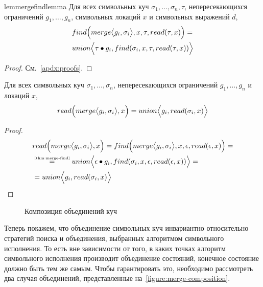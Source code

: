%
\begin{restatable}{lem}{mergefindlemma}\label{thm:merge-find}
Для всех символьных куч $\sigma_1,\ldots,\sigma_n, \tau$, непересекающихся ограничений $g_1,\ldots,g_n$, символьных локаций $x$ и символьных выражений $d$,
\begin{align*}
&find\Big(merge\big\langle g_i, \sigma_i\big\rangle,x,\tau,read(\tau,x)\Big)=\\
&union\Big\langle\tau\bullet g_i, find(\sigma_i,x,\tau,read(\tau,x))\Big\rangle
\end{align*}
\end{restatable}
\begin{proof}См.~\autoref{apdx:proofs}.
\end{proof}
%
\begin{thm}\label{thm:merge-read}
Для всех символьных куч $\sigma_1,\ldots,\sigma_n$, непересекающихся ограничений $g_1,\ldots,g_n$ и локаций $x$,
\begin{align*}
read\Big(merge\big\langle g_i, \sigma_i\big\rangle,x\Big)=union\Big\langle g_i, read(\sigma_i,x)\Big\rangle
\end{align*}
\end{thm}
\begin{proof}
\begin{align*}
&\DereF{\amerge\paiR{g_i}{\sigma_i}}{x}=\Find{\amerge\paiR{g_i}{\sigma_i}}{x}{\emptyheap}{\deref{\emptyheap}{x}}=\\
&\eqby{\autoref{thm:merge-find}}\aunion\Pair{\fillterm{\emptyheap}{g_i}}{\find{\sigma_i}{x}{\emptyheap}{\deref{\emptyheap}{x}}}=\\
&=\aunion\Pair{g_i}{\deref{\sigma_i}{x}}
\end{align*}
\end{proof}
%
\vspace{-0.5in}
\begin{figure}[H]
\centering
\begin{minipage}[t]{.45\textwidth}
	\resizebox{\textwidth}{!}{\mergeleftpict}
\end{minipage}
\begin{minipage}[t]{.45\textwidth}
	\resizebox{\textwidth}{!}{\mergerightpict}
\end{minipage}
\caption{Композиция объединений куч}
\label{figure:merge-composition}
\end{figure}
\vspace{-0.3in}
%
Теперь покажем, что объединение символьных куч инвариантно относительно стратегий поиска и объединения, выбранных алгоритмом символьного исполнения. То есть вне зависимости от того, в каких точках алгоритм символьного исполнения производит объединение состояний, конечное состояние должно быть тем же самым. Чтобы гарантировать это, необходимо рассмотреть два случая объединений, представленные на~\autoref{figure:merge-composition}.
